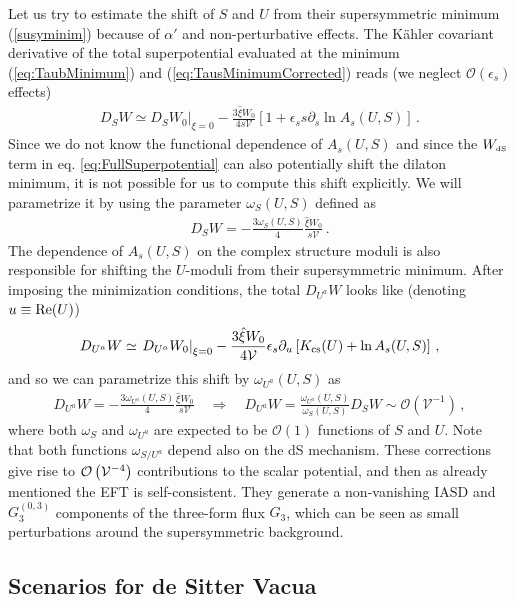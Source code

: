 \documentclass[12pt,a4paper]{book}
\def\dS{{\scriptscriptstyle \rm dS}}
\newcommand{\mc}{\mathcal}
\newcommand{\V}{{\cal{V}}}
\begin{document}
Let us try to estimate the shift of $S$ and $U$ from their supersymmetric minimum (\ref{susyminim}) because of $\alpha'$ and non-perturbative effects. The K\"ahler covariant derivative of the total superpotential evaluated at the minimum (\ref{eq:TaubMinimum}) and (\ref{eq:TausMinimumCorrected}) reads (we neglect $\mc{O}(\epsilon_s)$ effects)
\begin{align}
D_S W \simeq \left.D_S W_0\right|_{\xi = 0} - \frac{3\hat\xi W_0}{4s\mathcal{V}}
\left[1 + \epsilon_s s\partial_s \ln A_s(U,S)\right]\,.
\end{align}
Since we do not know the functional dependence of $A_s(U,S)$ and since the $W_\dS$ term in eq. \eqref{eq:FullSuperpotential} can also potentially shift the dilaton minimum, it is not possible for us to compute this shift explicitly. We will parametrize it by using the parameter $\omega_S(U,S)$ defined as
\begin{align}
\label{dilmin}
D_S W = - \frac{3 \omega_S(U,S)}{4} \frac{\hat\xi W_0}{s\mathcal{V}}\,.
\end{align}
The dependence of $A_s(U, S)$ on the complex structure moduli is also responsible for shifting the $U$-moduli
from their supersymmetric minimum. After imposing the minimization conditions, the total $D_{U^a} W$ looks like (denoting $u\equiv {\rm Re}(U)$)
\begin{align}
D_{U^a} W \simeq \left.D_{U^a} W_0\right|_{\xi = 0} - \frac{3\hat\xi W_0}{4\mathcal{V}}
\epsilon_s \partial_u\left[K_{\rm cs}(U)+  \ln A_s(U,S)\right]\,,
\end{align}
and so we can parametrize this shift by $\omega_{U^a}(U,S)$ as
\begin{align}
\label{csmin}
D_{U^a} W = - \frac{3 \omega_{U^a} (U,S)}{4} \frac{\hat\xi W_0}{s\mathcal{V}} \quad\Rightarrow\quad D_{U^a} W =\frac{\omega_{U^a} (U,S)}{\omega_S(U,S)} D_S W\sim \mc{O}(\mathcal{V}^{-1})\,,
\end{align}
where both $\omega_S$ and $\omega_{U^a}$ are expected to be $\mc{O}(1)$ functions of $S$ and $U$. Note that both functions $\omega_{S/U^a}$ depend also on the dS mechanism. These corrections give rise to $\mathcal{O}\left(\V^{-4}\right)$ contributions to the scalar potential, and then as already mentioned the EFT is self-consistent. They generate a non-vanishing IASD and $G_3^{(0,3)}$ components of the three-form flux $G_3$, which can be seen as small perturbations around the supersymmetric background.

\subsection{Scenarios for de Sitter Vacua}
\label{ssec:deSitterScenarios}
\end{document}
